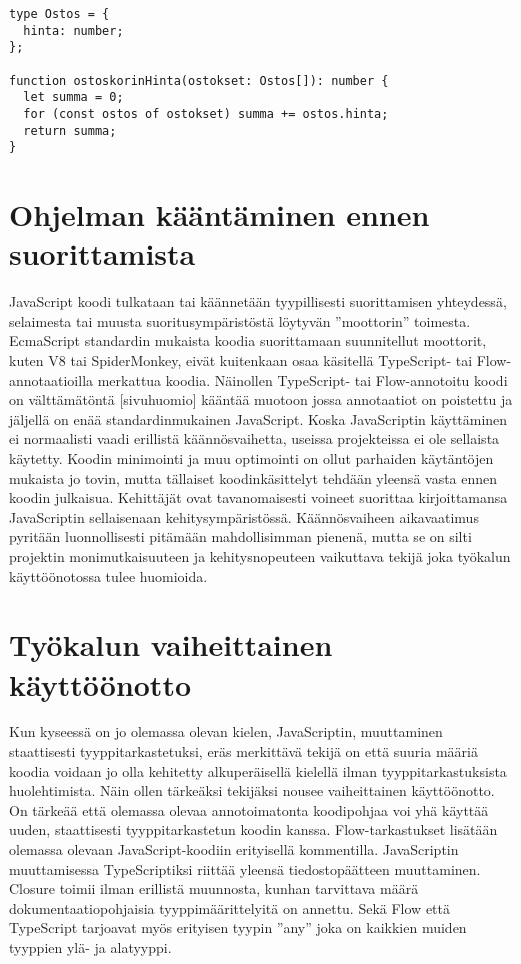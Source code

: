 \begin{minipage}{\linewidth}
\begin{lstlisting}[caption=Esimerkki Flow tai TypeScript annotaatiosta funktiolle]
type Ostos = {
  hinta: number;
};

function ostoskorinHinta(ostokset: Ostos[]): number {
  let summa = 0;
  for (const ostos of ostokset) summa += ostos.hinta;
  return summa;
}
\end{lstlisting}
\end{minipage}

\section{Ohjelman kääntäminen ennen suorittamista}

JavaScript koodi tulkataan tai käännetään tyypillisesti suorittamisen
yhteydessä, selaimesta tai muusta suoritusympäristöstä löytyvän ”moottorin”
toimesta. EcmaScript standardin mukaista koodia suorittamaan suunnitellut
moottorit, kuten V8 tai SpiderMonkey, eivät kuitenkaan osaa käsitellä
TypeScript- tai Flow-annotaatioilla merkattua koodia. Näinollen TypeScript-
tai Flow-annotoitu koodi on välttämätöntä [sivuhuomio] kääntää muotoon jossa
annotaatiot on poistettu ja jäljellä on enää standardinmukainen JavaScript.
Koska JavaScriptin käyttäminen ei normaalisti vaadi erillistä
käännösvaihetta, useissa projekteissa ei ole sellaista käytetty. Koodin
minimointi ja muu optimointi on ollut parhaiden käytäntöjen mukaista jo
tovin, mutta tällaiset koodinkäsittelyt tehdään yleensä vasta ennen koodin
julkaisua. Kehittäjät ovat tavanomaisesti voineet suorittaa kirjoittamansa
JavaScriptin sellaisenaan kehitysympäristössä. Käännösvaiheen aikavaatimus
pyritään luonnollisesti pitämään mahdollisimman pienenä, mutta se on silti
projektin monimutkaisuuteen ja kehitysnopeuteen vaikuttava tekijä joka
työkalun käyttöönotossa tulee huomioida.

\section{Työkalun vaiheittainen käyttöönotto}

Kun kyseessä on jo olemassa olevan kielen, JavaScriptin, muuttaminen
staattisesti tyyppitarkastetuksi, eräs merkittävä tekijä on että suuria
määriä koodia voidaan jo olla kehitetty alkuperäisellä kielellä ilman
tyyppitarkastuksista huolehtimista. Näin ollen tärkeäksi tekijäksi nousee
vaiheittainen käyttöönotto. On tärkeää että olemassa olevaa annotoimatonta
koodipohjaa voi yhä käyttää uuden, staattisesti tyyppitarkastetun koodin
kanssa. Flow-tarkastukset lisätään olemassa olevaan JavaScript-koodiin
erityisellä kommentilla. JavaScriptin muuttamisessa TypeScriptiksi riittää
yleensä tiedostopäätteen muuttaminen. Closure toimii ilman erillistä
muunnosta, kunhan tarvittava määrä dokumentaatiopohjaisia tyyppimäärittelyitä
on annettu. Sekä Flow että TypeScript tarjoavat myös erityisen tyypin ”any”
joka on kaikkien muiden tyyppien ylä- ja alatyyppi.